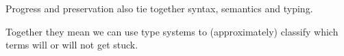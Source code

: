 \begin{frame}[c]
  Progress and preservation also tie together syntax, semantics and typing.
\end{frame}

\begin{frame}[c]
  Together they mean we can use type systems to (approximately) classify which terms will or will not get stuck.
\end{frame}